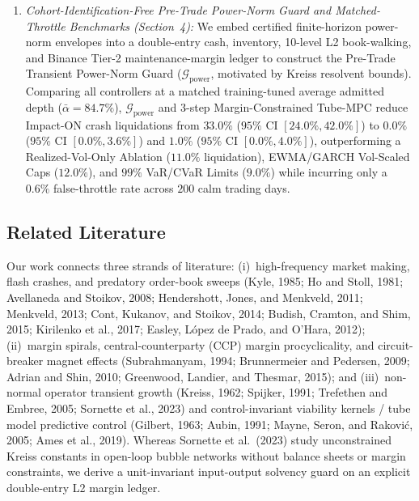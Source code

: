 \documentclass[11pt]{article}
\theoremstyle{remark}
\begin{document}
\begin{enumerate}
    \item \emph{Cohort-Identification-Free Pre-Trade Power-Norm Guard and Matched-Throttle Benchmarks (Section~4):} We embed certified finite-horizon power-norm envelopes into a double-entry cash, inventory, 10-level L2 book-walking, and Binance Tier-2 maintenance-margin ledger to construct the Pre-Trade Transient Power-Norm Guard ($\mathcal{G}_{\text{power}}$, motivated by Kreiss resolvent bounds). Comparing all controllers at a matched training-tuned average admitted depth ($\bar{\alpha} = 84.7\%$), $\mathcal{G}_{\text{power}}$ and 3-step Margin-Constrained Tube-MPC reduce Impact-ON crash liquidations from $33.0\%$ ($95\%$ CI $[24.0\%, 42.0\%]$) to $0.0\%$ ($95\%$ CI $[0.0\%, 3.6\%]$) and $1.0\%$ ($95\%$ CI $[0.0\%, 4.0\%]$), outperforming a Realized-Vol-Only Ablation ($11.0\%$ liquidation), EWMA/GARCH Vol-Scaled Caps ($12.0\%$), and $99\%$ VaR/CVaR Limits ($9.0\%$) while incurring only a $0.6\%$ false-throttle rate across $200$ calm trading days.
\end{enumerate}

\subsection{Related Literature}
Our work connects three strands of literature: (i)~high-frequency market making, flash crashes, and predatory order-book sweeps (Kyle, 1985; Ho and Stoll, 1981; Avellaneda and Stoikov, 2008; Hendershott, Jones, and Menkveld, 2011; Menkveld, 2013; Cont, Kukanov, and Stoikov, 2014; Budish, Cramton, and Shim, 2015; Kirilenko et al., 2017; Easley, L\'opez de Prado, and O'Hara, 2012); (ii)~margin spirals, central-counterparty (CCP) margin procyclicality, and circuit-breaker magnet effects (Subrahmanyam, 1994; Brunnermeier and Pedersen, 2009; Adrian and Shin, 2010; Greenwood, Landier, and Thesmar, 2015); and (iii)~non-normal operator transient growth (Kreiss, 1962; Spijker, 1991; Trefethen and Embree, 2005; Sornette et al., 2023) and control-invariant viability kernels / tube model predictive control (Gilbert, 1963; Aubin, 1991; Mayne, Seron, and Rakovi\'c, 2005; Ames et al., 2019). Whereas Sornette et al.\ (2023) study unconstrained Kreiss constants in open-loop bubble networks without balance sheets or margin constraints, we derive a unit-invariant input-output solvency guard on an explicit double-entry L2 margin ledger.
\end{document}
